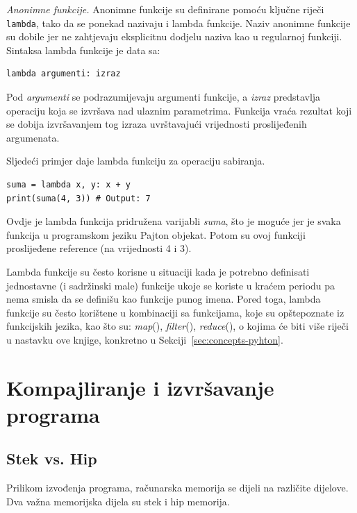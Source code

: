 \textit{Anonimne funkcije.}  Anonimne funkcije su definirane pomoću ključne riječi \texttt{lambda}, tako da se ponekad nazivaju i lambda funkcije.  Naziv anonimne funkcije su dobile jer ne zahtjevaju eksplicitnu dodjelu naziva kao u regularnoj funkciji. Sintaksa lambda funkcije je data sa:

\begin{verbatim}
lambda argumenti: izraz
\end{verbatim}
Pod \textit{argumenti} se podrazumijevaju argumenti funkcije, a \textit{izraz} predstavlja operaciju koja se izvršava nad ulaznim parametrima. Funkcija vraća rezultat koji se dobija izvršavanjem tog izraza uvrštavajući vrijednosti proslijeđenih argumenata. 

Sljedeći primjer daje lambda funkciju za operaciju sabiranja.
\begin{verbatim}
suma = lambda x, y: x + y
print(suma(4, 3)) # Output: 7
\end{verbatim}

Ovdje je lambda funkcija pridružena varijabli \textit{suma}, što je moguće jer je svaka funkcija u programskom jeziku Pajton objekat. Potom su ovoj funkciji proslijeđene reference (na vrijednosti 4 i 3). 

Lambda funkcije su često korisne u situaciji kada je potrebno definisati jednostavne (i sadržinski male) funkcije ukoje se koriste u kraćem periodu pa nema smisla da se definišu kao funkcije punog imena. Pored toga, lambda funkcije su često korištene u kombinaciji sa funkcijama, koje su opštepoznate iz funkcijskih jezika, kao što su: \textit{map}(), \textit{filter}(), \textit{reduce}(), o kojima će biti više riječi u nastavku ove knjige, konkretno u Sekciji~\ref{sec:concepts-pyhton}. 


\section{Kompajliranje i izvršavanje programa}

\subsection{Stek vs. Hip} 


Prilikom izvođenja programa, računarska memorija se dijeli na različite dijelove. Dva važna memorijska dijela su stek i hip memorija. 

